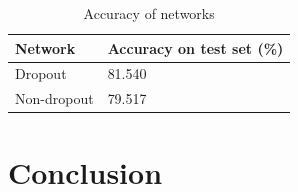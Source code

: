 \documentclass{article} %
\begin{document}
\begin{table}
\centering 
    \begin{tabular}{l|l}
    \hline
    Network     & Accuracy on test set (\%) \\ \hline
    Dropout     & 81.540                 \\ \hline
    Non-dropout & 79.517                 \\ \hline
    \end{tabular}
     \caption{Accuracy of networks}   
     \label{table1}
\end{table}

\section{Conclusion}



\end{document}
